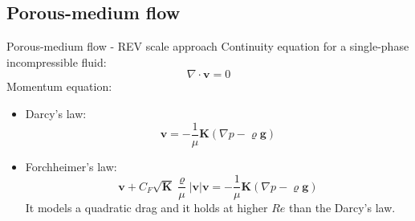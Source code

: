 \documentclass{beamer}
\begin{document}
\subsection*{Porous-medium flow}
\begin{frame}{Porous-medium flow - REV scale approach}
Continuity equation for a single-phase incompressible fluid:
\begin{equation*}
\nabla \cdot \mathbf{v} = 0
\end{equation*}
Momentum equation:
\begin{itemize}
	\item Darcy's law:
\begin{equation*}
	\mathbf{v} = -\frac{1}{\mu}\mathbf{K} (\nabla p - \varrho \mathbf{g})
\end{equation*}
	\item Forchheimer's law:
	\begin{equation*}
	\mathbf{v} + C_F \sqrt{\mathbf{K}} \frac{\varrho}{\mu} |\mathbf{v}| 
	\mathbf{v} = - \frac{1}{\mu}\mathbf{K} (\nabla p - \varrho \mathbf{g})
	\end{equation*}
	It models a quadratic drag and it holds at higher $Re$ than the Darcy's law.
\end{itemize}
\end{frame}
\end{document}
